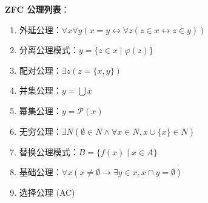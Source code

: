 \documentclass[12pt, a4paper]{article}
\begin{document}
\textbf{ZFC 公理列表}：
\begin{enumerate}
    \item 外延公理：\(\forall x \forall y (x=y \leftrightarrow \forall z (z \in x \leftrightarrow z \in y))\)
    \item 分离公理模式：\(y = \{ z \in x \mid \varphi(z) \}\)
    \item 配对公理：\(\exists z (z = \{ x, y \})\)
    \item 并集公理：\(y = \bigcup x\)
    \item 幂集公理：\(y = \mathcal{P}(x)\)
    \item 无穷公理：\(\exists N (\emptyset \in N \wedge \forall x \in N, x \cup \{x\} \in N)\)
    \item 替换公理模式：\(B = \{ f(x) \mid x \in A \}\)
    \item 基础公理：\(\forall x (x \neq \emptyset \to \exists y \in x, x \cap y = \emptyset)\)
    \item 选择公理 (AC)
\end{enumerate}
\end{document}
